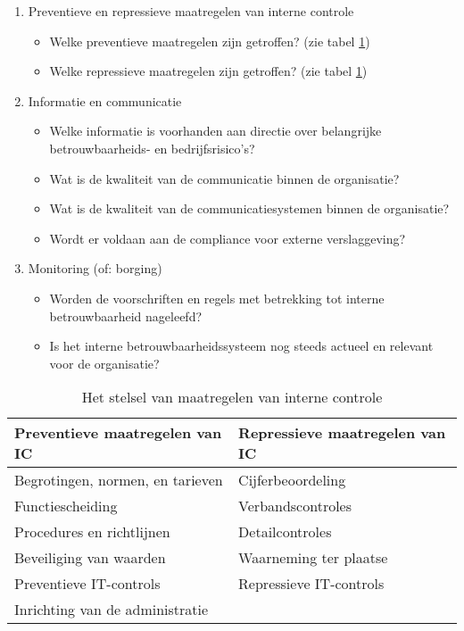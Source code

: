 \begin{enumerate}
\begin{itemize}
        \end{itemize}
    \item Preventieve en repressieve maatregelen van interne controle
        \begin{itemize}
            \item Welke preventieve maatregelen zijn getroffen? (zie tabel \ref{tab:icmaatregelen})
            \item Welke repressieve maatregelen zijn getroffen? (zie tabel \ref{tab:icmaatregelen})
        \end{itemize}
    \item Informatie en communicatie
        \begin{itemize}
            \item Welke informatie is voorhanden aan directie over belangrijke betrouwbaarheids- en bedrijfsrisico's?
            \item Wat is de kwaliteit van de communicatie binnen de organisatie?
            \item Wat is de kwaliteit van de communicatiesystemen binnen de organisatie?
            \item Wordt er voldaan aan de compliance voor externe verslaggeving? 
        \end{itemize}
    \item Monitoring (of: borging)
        \begin{itemize}
            \item Worden de voorschriften en regels met betrekking tot interne betrouwbaarheid nageleefd?
            \item Is het interne betrouwbaarheidssysteem nog steeds actueel en relevant voor de organisatie?
        \end{itemize}
\end{enumerate}


\begin{table}[!h]
    \centering
    \caption{Het stelsel van maatregelen van interne controle \citep{bivpraktijk}}
    \begin{tabular}{l l}
        \toprule
        \textbf{Preventieve maatregelen van IC} & \textbf{Repressieve maatregelen van IC} \\
        \midrule
        Begrotingen, normen, en tarieven & Cijferbeoordeling \\
        Functiescheiding & Verbandscontroles \\
        Procedures en richtlijnen & Detailcontroles \\
        Beveiliging van waarden & Waarneming ter plaatse \\
        Preventieve IT-controls & Repressieve IT-controls \\
        Inrichting van de administratie \\
        \bottomrule
    \end{tabular}
    \label{tab:icmaatregelen}
\end{table}